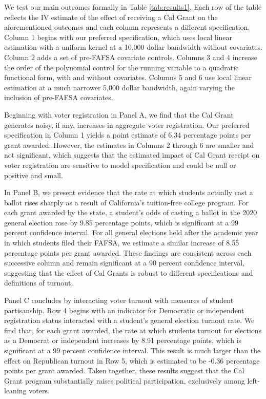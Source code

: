\documentclass[12pt,letterpaper,oneside]{book}
\begin{document}
We test our main outcomes formally in Table \ref{tab:results1}. Each row of the table reflects the IV estimate of the effect of receiving a Cal Grant on the aforementioned outcomes and each column represents a different specification. Column 1 begins with our preferred specification, which uses local linear estimation with a uniform kernel at a 10,000 dollar bandwidth without covariates. Column 2 adds a set of pre-FAFSA covariate controls. Columns 3 and 4 increase the order of the polynomial control for the running variable to a quadratic functional form, with and without covariates. Columns 5 and 6 use local linear estimation at a much narrower 5,000 dollar bandwidth, again varying the inclusion of pre-FAFSA covariates.

Beginning with voter registration in Panel A, we find that the Cal Grant generates noisy, if any, increases in aggregate voter registration. Our preferred specification in Column 1 yields a point estimate of 6.34 percentage points per grant awarded. However, the estimates in Columns 2 through 6 are smaller and not significant, which suggests that the estimated impact of Cal Grant receipt on voter registration are sensitive to model specification and could be null or positive and small.

In Panel B, we present evidence that the rate at which students actually cast a ballot rises sharply as a result of California's tuition-free college program. For each grant awarded by the state, a student's odds of casting a ballot in the 2020 general election rose by 9.85 percentage points, which is significant at a 99 percent confidence interval.  For all general elections held after the academic year in which students filed their FAFSA, we estimate a similar increase of 8.55 percentage points per grant awarded. These findings are consistent across each successive column and remain significant at a 90 percent confidence interval, suggesting that the effect of Cal Grants is robust to different specifications and definitions of turnout.

Panel C concludes by interacting voter turnout with measures of student partisanship. Row 4 begins with an indicator for Democratic or independent registration status interacted with a student's general election turnout rate. We find that, for each grant awarded, the rate at which students turnout for elections as a Democrat or independent increases by 8.91 percentage points, which is significant at a 99 percent confidence interval. This result is much larger than the effect on Republican turnout in Row 5, which is estimated to be -0.36 percentage points per grant awarded. Taken together, these results suggest that the Cal Grant program substantially raises political participation, exclusively among left-leaning voters.
\end{document}
